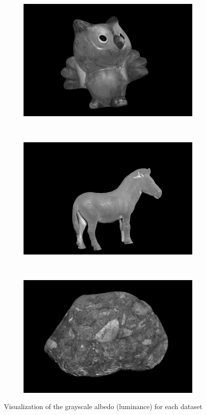 \documentclass{paper}
\begin{document}
\begin{figure}[h!]
     \begin{subfigure}{0.3\textwidth}
        \includegraphics[width=\textwidth]{results/owl/owl_a_lu}
    \end{subfigure}
    ~
    \begin{subfigure}{0.3\textwidth}
        \includegraphics[width=\textwidth]{results/horse/horse_a_lu}
    \end{subfigure}
    ~
    \begin{subfigure}{0.3\textwidth}
        \includegraphics[width=\textwidth]{results/rock/rock_a_lu}
    \end{subfigure}
    \caption{Visualization of the grayscale albedo (luminance) for each dataset}
    \label{fig:albedo_lum}       
\end{figure}
\end{document}
